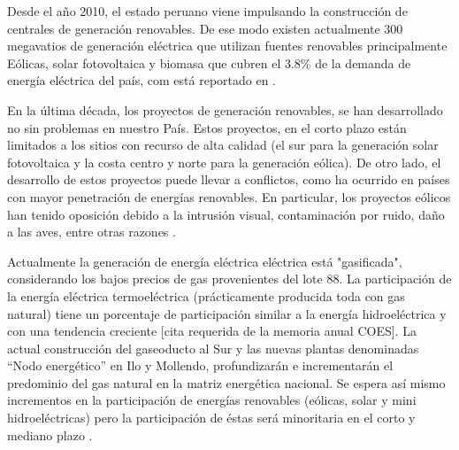Desde el año 2010, el estado peruano viene impulsando la construcción de centrales de generación renovables. De ese modo existen actualmente 300 megavatios de generación eléctrica que utilizan fuentes renovables principalmente Eólicas, solar fotovoltaica y biomasa que cubren el 3.8\% de la demanda de energía eléctrica del país, com está reportado en \citep{coes_memoria_2016}.

En la última década, los proyectos de generación renovables, se han desarrollado no sin problemas en nuestro País. Estos proyectos, en el corto plazo están limitados a los sitios con recurso de alta calidad (el sur para la generación solar fotovoltaica y la costa centro y norte para la generación eólica). De otro lado, el desarrollo de estos proyectos puede llevar a conflictos, como ha ocurrido en países con mayor penetración de energías renovables. En particular, los proyectos eólicos han tenido oposición debido a la intrusión visual, contaminación por ruido, daño a las aves, entre otras razones \citep[p.~282]{moriarty_energy_2018}.


%

Actualmente la generación de energía eléctrica eléctrica está "gasificada", considerando los bajos precios de gas provenientes  del lote 88. La participación de la energía eléctrica termoeléctrica (prácticamente producida toda con gas natural) tiene un porcentaje de participación similar a la energía hidroeléctrica y con una tendencia creciente [cita requerida de la memoria anual COES]. 
La actual construcción del gaseoducto al Sur y las nuevas plantas denominadas “Nodo energético” en Ilo y Mollendo, profundizarán e incrementarán el predominio del gas natural en la matriz energética nacional. Se espera así mismo incrementos en la participación de energías renovables (eólicas, solar y mini hidroeléctricas) pero  la participación de éstas  será minoritaria en el corto y mediano plazo \citep{coes_memoria_2016}.




